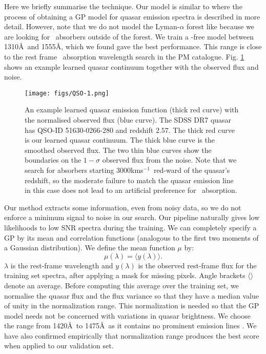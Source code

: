 \documentclass[fleqn,usenatbib]{mnras}
\newcommand{\civ}{\ion{C}{IV}}
\newcommand{\kms}{kms$^{-1}$} %
\begin{document}
Here we briefly
summarise the technique. Our model is similar to \cite{romanDLA}
where  the process of
obtaining a GP model for quasar emission spectra is described in more detail.
However, note that we do not model the Lyman-$\alpha$ forest like \cite{romanDLA}
because we are looking for \civ\  absorbers outside of the forest.
We train a \civ-free model between 1310\AA\ and
    1555\AA, which we found gave the best performance. This range
    is close to the rest frame  \civ\  absorption wavelength
    search in the PM catalogue.
Fig. \ref{fig:mu} shows an example learned quasar continuum together
with the observed flux and noise.
\begin{figure}
    \texttt{[image: figs/QSO-1.png]}
  \caption{An example learned quasar emission function (thick red curve) with the normalised observed flux (blue curve). The SDSS DR7 quasar has QSO-ID 51630-0266-280 and redshift $2.57$.  The thick red curve is our learned quasar continuum. The thick blue
   curve is the smoothed observed flux. The two thin blue curves show the boundaries on the $1-\sigma$ observed flux from the noise. Note that we search for absorbers starting 3000\kms\ red-ward of the quasar's redshift, so the moderate failure to match the quasar emission line in this case does not lead to an artificial preference for \civ\ absorption.
  }
  \label{fig:mu}
\end{figure}


Our method extracts some information, even from
noisy data, so we do not enforce a minimum signal to noise in our search.
Our pipeline naturally gives low likelihoods to low SNR spectra  during the training.
We can completely specify a GP by its mean and correlation functions (analogous to the first two moments of a Gaussian distribution).
We define the mean function $\mu$ by:
\begin{equation}
  \mu(\lambda) = \langle y(\lambda)  \rangle.
\end{equation}
$\lambda$ is the rest-frame wavelength and $y(\lambda)$ is
the observed rest-frame flux for the training set spectra, after
applying a mask for missing pixels. Angle brackets $\langle \rangle$
denote an average.
Before computing this average over the training set, we normalise the quasar flux
and the flux variance  so that they
have a median value of unity in the normalization range.
This normalization is needed
so that the GP model needs not be concerned with variations in quasar brightness.
We choose the range from 1420\AA \ to 1475\AA \ as it contains no prominent emission lines \citep{Zhu13, hamann17, Monadi21}.
We have also confirmed empirically that normalization range produces the best score when applied to our validation set.
\end{document}
